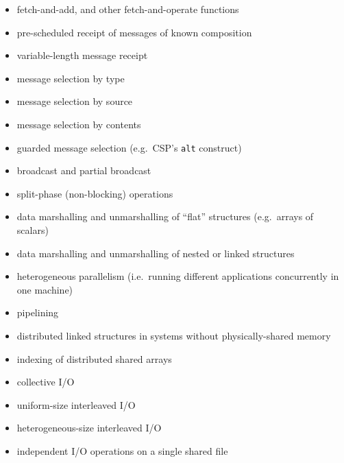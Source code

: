 \begin{itemize}
\item	fetch-and-add, and other fetch-and-operate functions
\item	pre-scheduled receipt of messages of known composition
\item	variable-length message receipt
\item	message selection by type
\item	message selection by source
\item	message selection by contents
\item	guarded message selection (e.g.\ CSP's {\tt{alt}} construct)
\item	broadcast and partial broadcast
\item	split-phase (non-blocking) operations
\item	data marshalling and unmarshalling of ``flat'' structures (e.g.\ arrays of scalars)
\item	data marshalling and unmarshalling of nested or linked structures
\item	heterogeneous parallelism (i.e.\ running different applications concurrently in one machine)
\item	pipelining
\item	distributed linked structures in systems without physically-shared memory
\item	indexing of distributed shared arrays
\item	collective I/O
\item	uniform-size interleaved I/O
\item	heterogeneous-size interleaved I/O
\item	independent I/O operations on a single shared file
\end{itemize}
